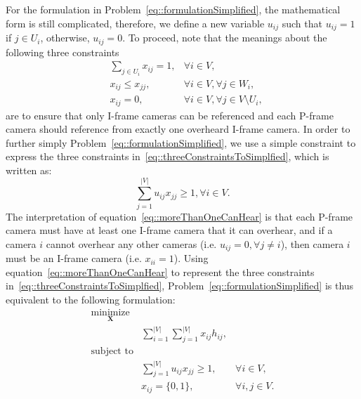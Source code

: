 For the formulation in Problem~\eqref{eq::formulationSimplified}, the mathematical form is still complicated, therefore, we define a new variable $u_{ij}$ such that $u_{ij} = 1$ if $j \in U_i$, otherwise, $u_{ij} = 0$.
To proceed, note that the meanings about the following three constraints
\begin{align}
&\sum_{j \in U_i} x_{ij} = 1, &\forall i \in V, \nonumber \\
&x_{ij} \leq x_{jj}, &\forall i \in V, \forall j \in W_i, \nonumber \\
&x_{ij} = 0, &\forall i \in V, \forall j \in V \setminus U_i,
\label{eq::threeConstraintsToSimplfied}
\end{align}
are to ensure that only I-frame cameras can be referenced and each P-frame camera should reference from exactly one overheard I-frame camera.
In order to further simply Problem~\eqref{eq::formulationSimplified}, we use a simple constraint to express the three constraints in~\eqref{eq::threeConstraintsToSimplfied}, which is written as:
\begin{equation}
\sum_{j=1}^{|V|} u_{ij} x_{jj} \geq 1, \forall i \in V.
\label{eq::moreThanOneCanHear}
\end{equation}
The interpretation of equation~\eqref{eq::moreThanOneCanHear} is that each P-frame camera must have at least one I-frame camera that it can overhear, and if a camera $i$ cannot overhear any other cameras (i.e. $u_{ij} = 0, \forall j \neq i$), then camera $i$ must be an I-frame camera (i.e. $x_{ii}=1$).
Using equation~\eqref{eq::moreThanOneCanHear} to represent the three constraints in~\eqref{eq::threeConstraintsToSimplfied}, Problem~\eqref{eq::formulationSimplified} is thus equivalent to the following formulation:
\begin{align}
\underset{\mathbf{X}}{\text{minimize}} & & \nonumber \\
	&\sum_{i=1}^{|V|} \sum_{j=1}^{|V|}  x_{ij} h_{ij}, & \nonumber \\
\text{subject to} & & \nonumber \\
	&\sum_{j=1}^{|V|} u_{ij} x_{jj} \geq 1, &\forall i \in V, \nonumber \\
	&x_{ij} = \{0,1\}, &\forall i,j \in V.
\label{eq::formulationSimplifiedAsGraph}
\end{align}

